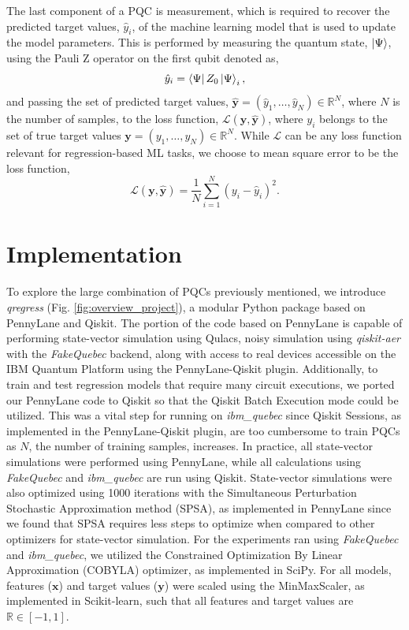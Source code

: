 \documentclass[journal=jacsat,manuscript=article]{achemso}
\begin{document}
The last component of a PQC is measurement, which is required to recover the predicted target values, $\hat{y}_{i}$, of the machine learning model that is used to update the model parameters.
This is performed by measuring the quantum state, $\ket{\Psi}$, using the Pauli Z operator on the first qubit denoted as,
\begin{equation}
	\hat{y}_{i} = \bra{\Psi}Z_{0}\ket{\Psi}_{i},
	\label{eq:y_pred}
\end{equation}
and passing the set of predicted target values, $\bm{\hat{y}} = (\hat{y}_{1}, \ldots, \hat{y}_{N}) \in \mathbb{R}^{N}$, where $N$ is the number of samples, to the loss function, $\mathcal{L}(\bm{y}, \bm{\hat y})$, where $y_{i}$ belongs to the set of true target values $\bm{y} = (y_{1}, \ldots, y_{N}) \in \mathbb{R}^{N}$.
While $\mathcal{L}$ can be any loss function relevant for regression-based ML tasks, we choose to mean square error to be the loss function,
\begin{equation}
	\mathcal{L}(\bm{y}, \bm{\hat y}) = \frac{1}{N} \sum_{i=1}^{N} (y_{i} - \hat{y}_{i})^{2}.
	\label{eq:isthisloss}
\end{equation}


\section{Implementation}
To explore the large combination of PQCs previously mentioned, we introduce \textit{qregress} (Fig. \ref{fig:overview_project}), a modular Python package based on PennyLane\cite{bergholm_pennylane_2022} and Qiskit\cite{javadi-abhari_quantum_2024}.
The portion of the code based on PennyLane is capable of performing state-vector simulation using Qulacs\cite{suzuki_qulacs_2021}, noisy simulation using \textit{qiskit-aer} with the \textit{FakeQuebec} backend, along with access to real devices accessible on the IBM Quantum Platform using the PennyLane-Qiskit plugin.
Additionally, to train and test regression models that require many circuit executions, we ported our PennyLane code to Qiskit so that the Qiskit Batch Execution mode could be utilized.
This was a vital step for running on \textit{ibm\_quebec} since Qiskit Sessions, as implemented in the PennyLane-Qiskit plugin, are too cumbersome to train PQCs as $N$, the number of training samples, increases.
In practice, all state-vector simulations were performed using PennyLane, while all calculations using \textit{FakeQuebec} and \textit{ibm\_quebec}  are run using Qiskit.
State-vector simulations were also optimized using 1000 iterations with the Simultaneous Perturbation Stochastic Approximation method (SPSA), as implemented in PennyLane since we found that SPSA requires less steps to optimize when compared to other optimizers for state-vector simulation. 
For the experiments ran using \textit{FakeQuebec} and  \textit{ibm\_quebec}, we utilized the Constrained Optimization By Linear Approximation (COBYLA) optimizer, as implemented in SciPy\cite{virtanen_scipy_2020}.
For all models, features ($\mathbf{x}$) and target values ($\mathbf{y}$) were scaled using the MinMaxScaler, as implemented in Scikit-learn\cite{pedregosa_scikit-learn_2011}, such that all features and target values are $\mathbb{R}\in [ -1,1 ]$.
\end{document}
